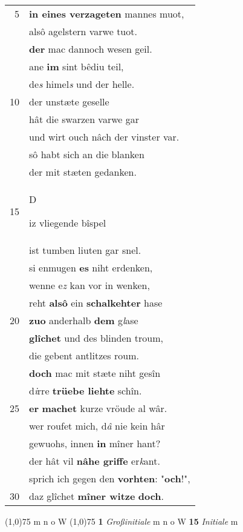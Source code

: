 \documentclass[8pt,a4paper,notitlepage]{article}
\begin{document}
\begin{table}[ht]
\begin{minipage}[t]{0.5\linewidth}
\begin{tabular}{rl}
5 & \textbf{in eines verzageten} mannes muot,\\ 
 & alsô agelstern varwe tuot.\\ 
 & \textbf{der} mac dannoch wesen geil.\\ 
 & ane \textbf{im} sint bêdiu teil,\\ 
 & de\textit{s} himel\textit{s} und der helle.\\ 
10 & der unstæte geselle\\ 
 & hât die swarzen varwe gar\\ 
 & und wirt ouch nâch der vinster var.\\ 
 & sô habt sich an die blanken\\ 
 & der mit stæten gedanken.\\ 
15 & \begin{large}D\end{large}iz vliegende bîspel\\ 
 & ist tumben liuten gar snel.\\ 
 & si enmugen \textbf{es} niht erdenken,\\ 
 & wenne e\textit{z} kan vor in wenken,\\ 
 & reht \textbf{alsô} ein \textbf{schalkehter} hase\\ 
20 & \textbf{zuo} anderhalb \textbf{dem} g\textit{l}ase\\ 
 & \textbf{glîchet} und des blinden troum,\\ 
 & die gebent antlitzes roum.\\ 
 & \textbf{doch} mac mit stæte niht gesîn\\ 
 & d\textit{i}rre \textbf{trüebe liehte} schîn.\\ 
25 & \textbf{er} \textbf{machet} kurze vröude al wâr.\\ 
 & wer roufet mich, d\textit{â} nie kein hâr\\ 
 & gewuohs, innen \textbf{in} mîner hant?\\ 
 & der hât vil \textbf{nâhe griffe} er\textit{k}ant.\\ 
 & sprich ich gegen den \textbf{vorhten}: "\textbf{och}!",\\ 
30 & daz glîchet \textbf{mîner witze} \textbf{doch}.\\ 
\end{tabular}
\scriptsize
\line(1,0){75} \newline
m n o W \newline
\line(1,0){75} \newline
\textbf{1} \textit{Großinitiale} m n o W  \textbf{15} \textit{Initiale} m  \newline

\end{minipage}
\end{table}
\end{document}
